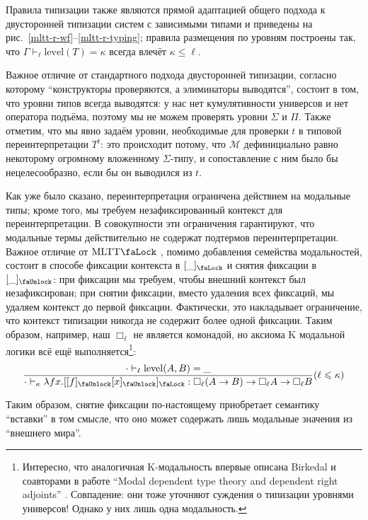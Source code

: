 Правила типизации также являются прямой адаптацией
общего подхода к двусторонней типизации систем с
зависимыми типами \cite{Thiago2025} и приведены на
рис.~\ref{mltt-r-wf}--\ref{mltt-r-typing}; правила
размещения по уровням построены так, что
$\Gamma\vdash_\ell\mathrm{level}(T)=\kappa$
всегда влечёт $\kappa\leqslant\ell$.

Важное отличие от стандартного подхода двусторонней
типизации, согласно которому ``конструкторы
проверяются, а элиминаторы выводятся'', состоит в том,
что уровни типов всегда выводятся: у нас нет
кумулятивности универсов и нет оператора подъёма,
поэтому мы не можем проверять уровни $\Sigma$ и $\Pi$.
Также отметим, что мы явно задаём уровни, необходимые
для проверки $t$ в типовой переинтерпретации $T^t$: это
происходит потому, что $\mathcal{M}$ дефинициально
равно некоторому огромному вложенному $\Sigma$-типу, и
сопоставление с ним было бы нецелесообразно, если бы он
выводился из $t$.

Как уже было сказано, переинтерпретация ограничена
действием на модальные типы; кроме того, мы требуем
незафиксированный контекст для переинтерпретации. В
совокупности эти ограничения гарантируют, что модальные
термы действительно не содержат подтермов
переинтерпретации. Важное отличие от
$\mathrm{MLTT}\text{\faLock}$ \cite{Gratzer2019},
помимо добавления семейства модальностей, состоит в
способе фиксации контекста в $[\_]_\text{\faLock}$ и
снятия фиксации в $[\_]_\text{\faUnlock}$: при фиксации
мы требуем, чтобы внешний контекст был незафиксирован;
при снятии фиксации, вместо удаления всех фиксаций, мы
удаляем контекст до первой фиксации. Фактически, это
накладывает ограничение, что контекст типизации никогда
не содержит более одной фиксации. Таким образом,
например, наш $\Box_\ell$ не является комонадой, но
аксиома K модальной логики всё ещё
выполняется\footnote{Интересно, что аналогичная
K-модальность впервые описана Birkedal и соавторами в
работе ``Modal dependent type theory and dependent
right adjoints'' \cite{Birkedal2020}. Совпадение: они
тоже уточняют суждения о типизации уровнями универсов!
Однако у них лишь одна модальность.}:
\[
    \dfrac{\cdot\vdash_\ell\mathrm{level}(A,B)=\_}{
        \cdot\vdash_\kappa\lambda f x.[[f
            ]_\text{\faUnlock}[x]_\text{\faUnlock}
        ]_\text{\faLock}:\Box_\ell(A\to B)\to
            \Box_\ell A\to\Box_\ell B
    }(\ell\leqslant\kappa)
\]

Таким образом, снятие фиксации по-настоящему
приобретает семантику ``вставки'' в том смысле, что оно
может содержать лишь модальные значения из ``внешнего
мира''.

